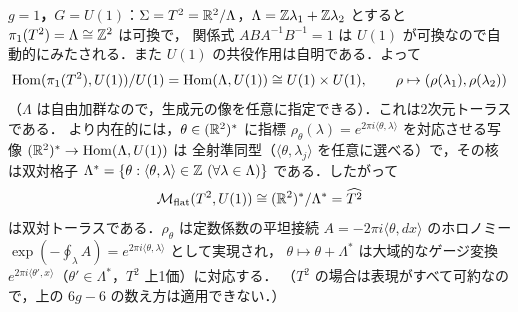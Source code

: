 \textbf{$g=1$，$G=U(1)$}：$\Sigma=T^2=\mathbb{R}^2/\Lambda$，$\Lambda=\mathbb{Z}\lambda_1+\mathbb{Z}\lambda_2$ とすると $\pi_1(T^2)=\Lambda\cong\mathbb{Z}^2$ は可換で，
関係式 $ABA^{-1}B^{-1}=1$ は $U(1)$ が可換なので自動的にみたされる．また $U(1)$ の共役作用は自明である．よって
\begin{equation*}
  \operatorname{Hom}(\pi_1(T^2),U(1))/U(1) = \operatorname{Hom}(\Lambda,U(1)) \cong U(1)\times U(1),\qquad \rho\mapsto(\rho(\lambda_1),\rho(\lambda_2))
\end{equation*}
（$\Lambda$ は自由加群なので，生成元の像を任意に指定できる）．これは2次元トーラスである．
より内在的には，$\theta\in(\mathbb{R}^2)^*$ に指標 $\rho_\theta(\lambda)=e^{2\pi i\langle\theta,\lambda\rangle}$ を対応させる写像 $(\mathbb{R}^2)^*\to\operatorname{Hom}(\Lambda,U(1))$ は
全射準同型（$\langle\theta,\lambda_j\rangle$ を任意に選べる）で，その核は双対格子 $\Lambda^*=\{\theta:\langle\theta,\lambda\rangle\in\Z\ (\forall\lambda\in\Lambda)\}$ である．したがって
\begin{equation*}
  \mathcal{M}_{\rm flat}(T^2,U(1)) \cong (\mathbb{R}^2)^*/\Lambda^* = \widehat{T^2}
\end{equation*}
は双対トーラスである．$\rho_\theta$ は定数係数の平坦接続 $A=-2\pi i\langle\theta,dx\rangle$ のホロノミー $\exp(-\oint_\lambda A)=e^{2\pi i\langle\theta,\lambda\rangle}$ として実現され，
$\theta\mapsto\theta+\Lambda^*$ は大域的なゲージ変換 $e^{2\pi i\langle\theta',x\rangle}$（$\theta'\in\Lambda^*$，$T^2$ 上1価）に対応する．
（$T^2$ の場合は表現がすべて可約なので，上の $6g-6$ の数え方は適用できない．）

